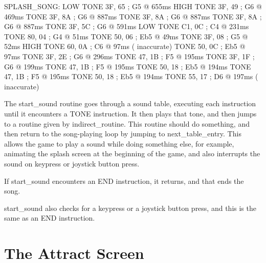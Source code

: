 \documentclass[10pt]{report}
\begin{document}
\nwenddocs{}\endmoddef\nwstartdeflinemarkup\nwenddeflinemarkup
SPLASH_SONG:
    LOW
    TONE 3F, 65     ; G5  @ 655ms
    HIGH
    TONE 3F, 49     ; G6  @ 469ms
    TONE 3F, 8A     ; G6  @ 887ms
    TONE 3F, 8A     ; G6  @ 887ms
    TONE 3F, 8A     ; G6  @ 887ms
    TONE 3F, 5C     ; G6  @ 591ms
    LOW
    TONE C1, 0C     ; C4  @ 231ms
    TONE 80, 04     ; G4  @  51ms
    TONE 50, 06     ; Eb5 @  49ms
    TONE 3F, 08     ; G5  @  52ms
    HIGH
    TONE 60, 0A     ; C6  @  97ms ( inaccurate)
    TONE 50, 0C     ; Eb5 @  97ms
    TONE 3F, 2E     ; G6  @ 296ms
    TONE 47, 1B     ; F5  @ 195ms
    TONE 3F, 1F     ; G6  @ 199ms
    TONE 47, 1B     ; F5  @ 195ms
    TONE 50, 18     ; Eb5 @ 194ms
    TONE 47, 1B     ; F5  @ 195ms
    TONE 50, 18     ; Eb5 @ 194ms
    TONE 55, 17     ; D6  @ 197ms ( inaccurate)
\nwendcode{}\nwdocspar

The {\Tt{}start{\_}sound\nwendquote} routine goes through a sound table, executing each
instruction until it encounters a {\Tt{}TONE\nwendquote} instruction. It then
plays that tone, and then jumps to a routine given by {\Tt{}indirect{\_}routine\nwendquote}. This
routine should do something, and then return to the song-playing loop by
jumping to {\Tt{}next{\_}table{\_}entry\nwendquote}. This allows the game to play a sound while doing
something else, for example, animating the splash screen at the beginning of the
game, and also interrupts the sound on keypress or joystick button press.

If {\Tt{}start{\_}sound\nwendquote} encounters an {\Tt{}END\nwendquote} instruction, it returns, and that ends
the song.

{\Tt{}start{\_}sound\nwendquote} also checks for a keypress or a joystick button press, and this
is the same as an {\Tt{}END\nwendquote} instruction.

\chapter{The Attract Screen}
\label{ch:attract}
\end{document}
